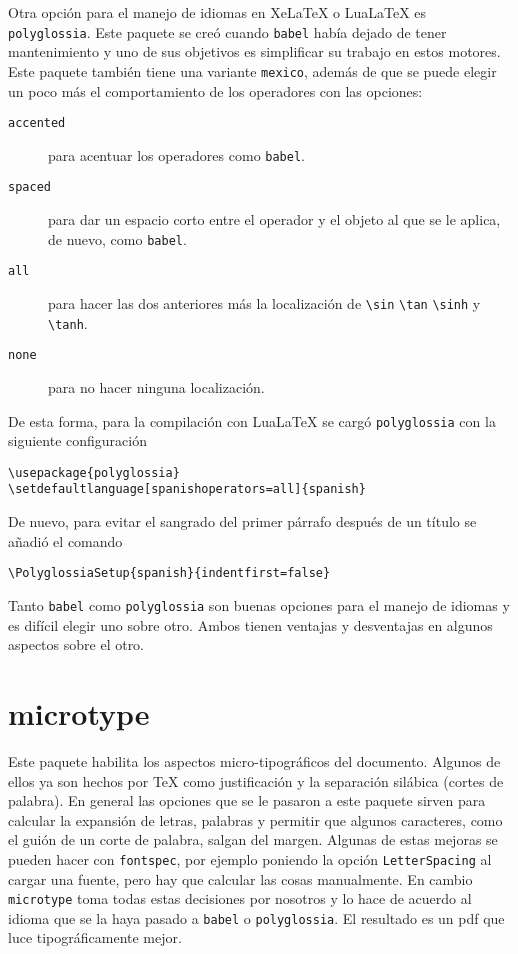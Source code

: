 Otra opción para el manejo de idiomas en Xe\LaTeX{} o Lua\LaTeX{} es
\texttt{polyglossia}. Este paquete se creó cuando \texttt{babel} había
dejado de tener mantenimiento y uno de sus objetivos es simplificar su
trabajo en estos motores. Este paquete también tiene una variante
\texttt{mexico}, además de que se puede elegir un poco más el comportamiento
de los operadores con las opciones:
\begin{description}
  \item[\texttt{accented}] para acentuar los operadores como \texttt{babel}.
  \item[\texttt{spaced}] para dar un espacio corto entre el operador y el objeto al que se le aplica, de nuevo, como \texttt{babel}.
  \item[\texttt{all}] para hacer las dos anteriores más la localización de \verb|\sin| \verb|\tan| \verb|\sinh| y \verb|\tanh|.
  \item[\texttt{none}] para no hacer ninguna localización.
\end{description}
De esta forma, para la compilación con Lua\LaTeX{} se cargó
\texttt{polyglossia} con la siguiente configuración
\begin{flushleft}
  \verb|\usepackage{polyglossia}| \\
  \verb|\setdefaultlanguage[spanishoperators=all]{spanish}|
\end{flushleft}

De nuevo, para evitar el sangrado del primer párrafo después de un título
se añadió el comando
\begin{flushleft}
  \verb|\PolyglossiaSetup{spanish}{indentfirst=false}|
\end{flushleft}

Tanto \texttt{babel} como \texttt{polyglossia} son buenas opciones para el
manejo de idiomas y es difícil elegir uno sobre otro. Ambos tienen ventajas
y desventajas en algunos aspectos sobre el otro.


\section{microtype}
Este paquete habilita los aspectos micro-tipográficos del documento. Algunos
de ellos ya son hechos por \TeX{} como justificación y la separación
silábica (cortes de palabra). En general las opciones que se le pasaron a
este paquete sirven para calcular la expansión de letras, palabras y
permitir que algunos caracteres, como el guión de un corte de palabra,
salgan del margen. Algunas de estas mejoras se pueden hacer con
\texttt{fontspec}, por ejemplo poniendo la opción \texttt{LetterSpacing} al
cargar una fuente, pero hay que calcular las cosas manualmente. En cambio
\texttt{microtype} toma todas estas decisiones por nosotros y lo hace
de acuerdo al idioma que se la haya pasado a \texttt{babel} o
\texttt{polyglossia}. El resultado es un pdf que luce tipográficamente mejor.



